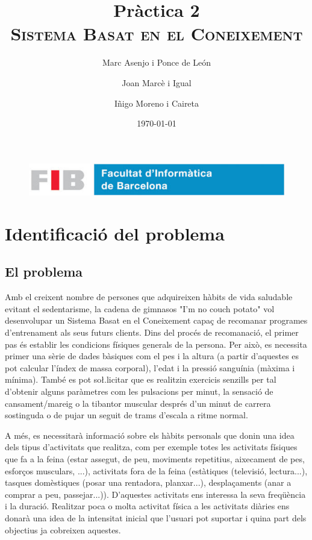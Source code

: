 \documentclass[a4paper, 12pt, UTF8]{article}
\title{
	\Huge
	\textbf{Pràctica 2} \\ 
	\scshape Sistema Basat en el Coneixement
	}
\author{
	Marc Asenjo i Ponce de León \and
	Joan Marcè i Igual \and
	Iñigo Moreno i Caireta
	}
\date{\today}
\begin{document}
\maketitle

\begin{figure}
	\centering
	\includegraphics[width=\linewidth]{./simple_FIB}
\end{figure}

\newpage
\tableofcontents

\newpage


\section{Identificació del problema}

\subsection{El problema}

Amb el creixent nombre de persones que adquireixen hàbits de vida saludable evitant el sedentarisme, la cadena de gimnasos "I'm no couch potato" vol desenvolupar un Sistema Basat en el Coneixement capaç de recomanar programes d'entrenament als seus futurs clients. Dins del procés de recomanació, el primer pas és establir les condicions físiques generals de la persona. Per això, es necessita primer una sèrie de dades bàsiques com el pes i la altura (a partir d'aquestes es pot calcular l'índex de massa corporal), l'edat i la pressió sanguínia (màxima i mínima). També es pot so\l.licitar que es realitzin exercicis senzills per tal d'obtenir alguns paràmetres com les pulsacions per minut, la sensació de cansament/mareig o la tibantor muscular després d'un minut de carrera sostinguda o de pujar un seguit de trams d'escala a ritme normal. 

A més, es necessitarà informació sobre els hàbits personals que donin una idea dels tipus d'activitats que realitza, com per exemple totes les activitats físiques que fa a la feina (estar assegut, de peu, moviments repetitius, aixecament de pes, esforços musculars, ...), activitats fora de la feina (estàtiques (televisió, lectura...), tasques domèstiques (posar una rentadora, planxar...), desplaçaments (anar a comprar a peu, passejar...)). D'aquestes activitats ens interessa la seva freqüència i la duració. Realitzar poca o molta activitat física a les activitats diàries ens donarà una idea de la intensitat inicial que l'usuari pot suportar i quina part dels objectius ja cobreixen aquestes. 
\end{document}
